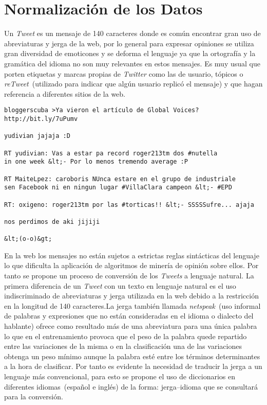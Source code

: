 \chapter{Normalización de los Datos}
\label{chap:prep}

Un \emph{Tweet} es un mensaje de 140 caracteres donde es común encontrar gran uso de abreviaturas y jerga
de la web, por lo general para expresar opiniones se utiliza gran diversidad de emoticones y se deforma el
lenguaje ya que la ortografía y la gramática del idioma no son muy relevantes en estos mensajes. Es muy
usual que porten etiquetas y marcas propias de \emph{Twitter} como las de usuario, tópicos o \emph{reTweet}~(utilizado
para indicar que algún usuario replicó el mensaje) y que hagan referencia a diferentes sitios de la web.

\begin{verbatim}
bloggerscuba >Ya vieron el artículo de Global Voices? http://bit.ly/7uPumv

yudivian jajaja :D

RT yudivian: Vas a estar pa record roger213tm dos #nutella 
in one week &lt;- Por lo menos tremendo average :P

RT MaiteLpez: caroboris NUnca estare en el grupo de industriale 
sen Facebook ni en ningun lugar #VillaClara campeon &lt;- #EPD

RT: oxigeno: roger213tm por las #torticas!! &lt;- SSSSSufre... ajaja

nos perdimos de aki jijiji

&lt;(o-o)&gt;
\end{verbatim}

En la web los mensajes no están sujetos a estrictas reglas sintácticas del lenguaje \cite{Merlo2010} lo que dificulta la
aplicación de algoritmos de minería de opinión sobre ellos. Por tanto se propone un proceso de conversión
de los \emph{Tweets} a lenguaje natural. La primera diferencia de un \emph{Tweet} con un texto en lenguaje natural es
el uso indiscriminado de abreviaturas y jerga utilizada en la web debido a la restricción en la longitud de
140 caracteres.La jerga también llamada \emph{netspeak}~(uso informal de palabras y expresiones que no están
consideradas en el idioma o dialecto del hablante) ofrece como resultado más de una abreviatura para
una única palabra lo que en el entrenamiento provoca que el peso de la palabra quede repartido entre las
variaciones de la misma o en la clasificación una de las variaciones obtenga un peso mínimo aunque la
palabra esté entre los términos determinantes a la hora de clasificar. Por tanto es evidente la necesidad de
traducir la jerga a un lenguaje más convencional, para esto se propone el uso de diccionarios en diferentes
idiomas~(español e inglés) de la forma: jerga--idioma que se consultará para la conversión.

